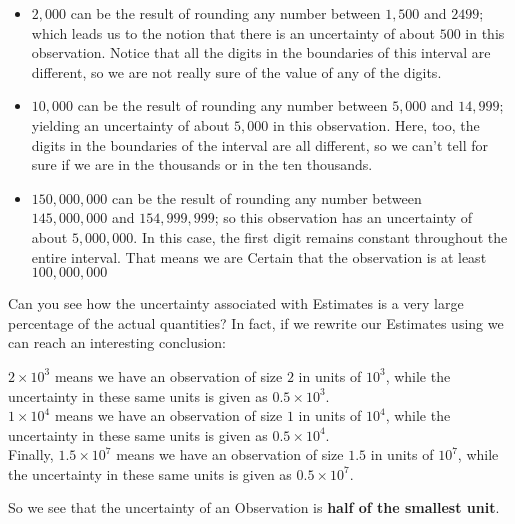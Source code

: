 \begin{adjustwidth}{0cm}{1cm}
\begin{itemize}
\item \(2,000\) can be the result of rounding any number between \(1,500\) and \(2499\); which leads us to the notion that there is an uncertainty of about \(500\) in this observation. Notice that all the digits in the boundaries of this interval are different, so we are not really sure of the value of any of the digits.

\item \(10,000\) can be the result of rounding any number between \(5,000\) and \(14,999\); yielding an uncertainty of about \(5,000\) in this observation. Here, too, the digits in the boundaries of the interval are all different, so we can't tell for sure if we are in the thousands or in the ten thousands.

\item \(150,000,000\) can be the result of rounding any number between    
\\ \(145,000,000\) and \(154,999,999\); so this observation has an uncertainty of about \(5,000,000\). In this case, the first digit remains constant throughout the entire interval. That means we are Certain that the observation is at least \(100,000,000\)
\end{itemize}
\end{adjustwidth}
\vspace{0.5cm}

Can you see how the uncertainty associated with Estimates is a very large percentage of the actual quantities?
\vspace{0.5cm}
In fact, if we rewrite our Estimates using  we can reach an interesting conclusion:

\begin{adjustwidth}{1cm}{1cm}
\(2\times 10^3\) means we have an observation of size \(2\) in units of \(10^3\), while the uncertainty in these same units is given as \(0.5\times 10^3\).
\\
\(1\times 10^4\) means we have an observation of size \(1\) in units of \(10^4\), while the uncertainty in these same units is given as \(0.5\times 10^4\).
\\
Finally, \(1.5\times 10^7\) means we have an observation of size \(1.5\) in units of \(10^7\), while the uncertainty in these same units is given as \(0.5\times 10^7\).

\end{adjustwidth}
\vspace{0.3cm}
So we see that the uncertainty of an Observation is \textbf{half of the smallest unit}.

